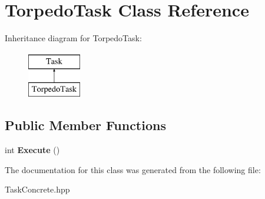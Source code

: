 \hypertarget{classTorpedoTask}{\section{\-Torpedo\-Task \-Class \-Reference}
\label{classTorpedoTask}
}
\-Inheritance diagram for \-Torpedo\-Task\-:\begin{figure}[H]
\begin{center}
\leavevmode
\includegraphics[height=2.000000cm]{classTorpedoTask}
\end{center}
\end{figure}
\subsection*{\-Public \-Member \-Functions}
\begin{DoxyCompactItemize}
\item 
\hypertarget{classTorpedoTask_a99b8c5838d90e1fe7a8ca0deae08b216}{int {\bfseries \-Execute} ()}\label{classTorpedoTask_a99b8c5838d90e1fe7a8ca0deae08b216}

\end{DoxyCompactItemize}


\-The documentation for this class was generated from the following file\-:\begin{DoxyCompactItemize}
\item 
\-Task\-Concrete.\-hpp\end{DoxyCompactItemize}
